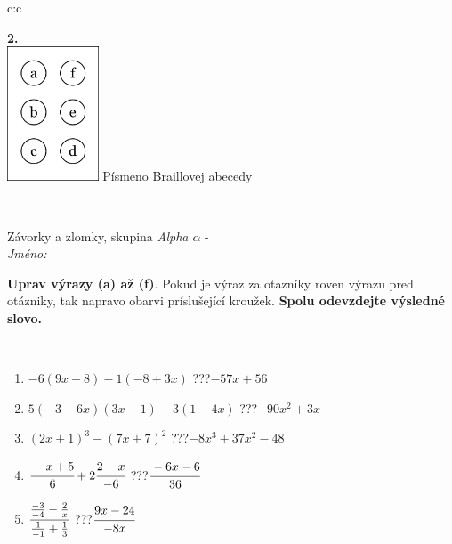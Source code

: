 \documentclass[10pt]{report}
\begin{document}
\begin{tabular}{c:c}
\begin{minipage}[c][104.5mm][t]{0.5\linewidth}
\begin{center}
\begin{minipage}{0.20\linewidth}
\begin{center}
{\Huge\bfseries 2.} \\[2mm]
\includegraphics[height=40mm]{../images/braille.png}
{\small Písmeno Braillovej abecedy}
\end{center}
\end{minipage}
\end{center}
\end{minipage}
\\ \hdashline
\begin{minipage}[c][104.5mm][t]{0.5\linewidth}
\begin{center}
\vspace{7mm}
{\huge Závorky a zlomky, skupina \textit{Alpha $\alpha$} -}\\[5mm]
\textit{Jméno:}\phantom{xxxxxxxxxxxxxxxxxxxxxxxxxxxxxxxxxxxxxxxxxxxxxxxxxxxxxxxxxxxxxxxxx}\\[5mm]
\begin{minipage}{0.95\linewidth}
\begin{center}
\textbf{Uprav výrazy (a) až (f)}. Pokud je výraz za otazníky roven výrazu pred otázniky, tak napravo obarvi príslušející kroužek. \textbf{Spolu odevzdejte výsledné slovo.}
\end{center}
\end{minipage}
\\[1mm]
\begin{minipage}{0.79\linewidth}
\begin{center}
\begin{varwidth}{\linewidth}
\begin{enumerate}
\normalsize
\item $-6(9x-8)-1(-8+3x)$\quad \dotfill\; ???\;\dotfill \quad $-57x+56$
\item $5(-3-6x)(3x-1)-3(1-4x)$\quad \dotfill\; ???\;\dotfill \quad $-90x^2+3x$
\item $(2x+1)^3-(7x+7)^2$\quad \dotfill\; ???\;\dotfill \quad $-8x^3+37x^2-48$
\item $\cfrac{-x+5}{6}+2\cfrac{2-x}{-6}$\quad \dotfill\; ???\;\dotfill \quad $\cfrac{-6x-6}{36}$
\item $\cfrac{\frac{-3}{-4}-\frac{2}{x}}{\frac{1}{-1}+\frac{1}{3}}$\quad \dotfill\; ???\;\dotfill \quad $\cfrac{9x-24}{-8x}$

\end{enumerate}
\end{varwidth}
\end{center}
\end{minipage}
\end{center}
\end{minipage}
\end{tabular}
\end{document}
